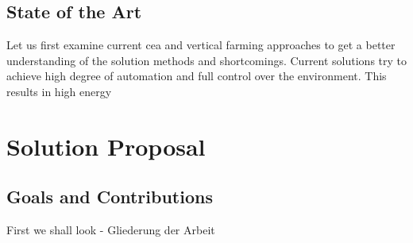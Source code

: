 \subsection{State of the Art}
Let us first examine current \ac{cea} and vertical farming approaches to get a better understanding of the solution methods and shortcomings.
Current solutions try to achieve high degree of automation and full control over the environment.
This results in high energy



\section{Solution Proposal}
\subsection{Goals and Contributions}
First we shall look
- Gliederung der Arbeit
